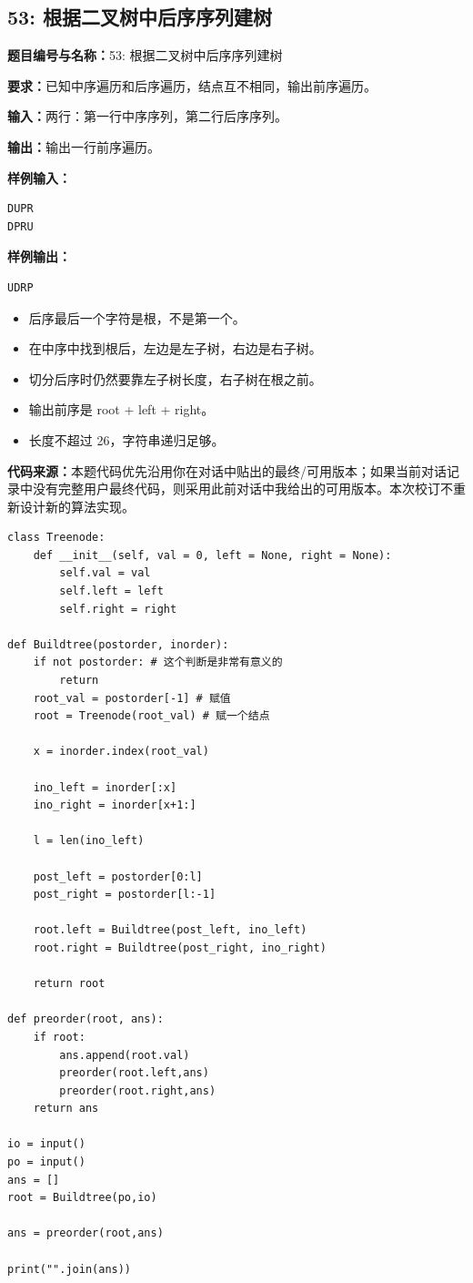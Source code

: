 \documentclass[10pt,a4paper,fontset=none]{ctexart}
\newcommand{\codesource}{\par\noindent\textbf{代码来源：}本题代码优先沿用你在对话中贴出的最终/可用版本；如果当前对话记录中没有完整用户最终代码，则采用此前对话中我给出的可用版本。本次校订不重新设计新的算法实现。\par\vspace{0.2em}}
\begin{document}
\subsection{53: 根据二叉树中后序序列建树}
\begin{taskbox}
\textbf{题目编号与名称：}53: 根据二叉树中后序序列建树\par
\textbf{要求：}已知中序遍历和后序遍历，结点互不相同，输出前序遍历。\par
\textbf{输入：}两行：第一行中序序列，第二行后序序列。\par
\textbf{输出：}输出一行前序遍历。\par
\textbf{样例输入：}
\begin{lstlisting}[style=sample]
DUPR
DPRU
\end{lstlisting}
\textbf{样例输出：}
\begin{lstlisting}[style=sample]
UDRP
\end{lstlisting}
\end{taskbox}
\begin{mistakebox}
\begin{itemize}
  \item 后序最后一个字符是根，不是第一个。
  \item 在中序中找到根后，左边是左子树，右边是右子树。
  \item 切分后序时仍然要靠左子树长度，右子树在根之前。
  \item 输出前序是 root + left + right。
  \item 长度不超过 26，字符串递归足够。
\end{itemize}
\end{mistakebox}
\codesource
\begin{lstlisting}[style=py,caption={最终可用代码（对话来源）}]
class Treenode:
    def __init__(self, val = 0, left = None, right = None):
        self.val = val
        self.left = left
        self.right = right

def Buildtree(postorder, inorder):
    if not postorder: # 这个判断是非常有意义的
        return 
    root_val = postorder[-1] # 赋值
    root = Treenode(root_val) # 赋一个结点

    x = inorder.index(root_val)

    ino_left = inorder[:x]
    ino_right = inorder[x+1:]

    l = len(ino_left)

    post_left = postorder[0:l]
    post_right = postorder[l:-1]

    root.left = Buildtree(post_left, ino_left)
    root.right = Buildtree(post_right, ino_right)

    return root

def preorder(root, ans):
    if root:
        ans.append(root.val)
        preorder(root.left,ans)
        preorder(root.right,ans)
    return ans

io = input()
po = input()
ans = []
root = Buildtree(po,io)

ans = preorder(root,ans)

print("".join(ans))
\end{lstlisting}
\end{document}
